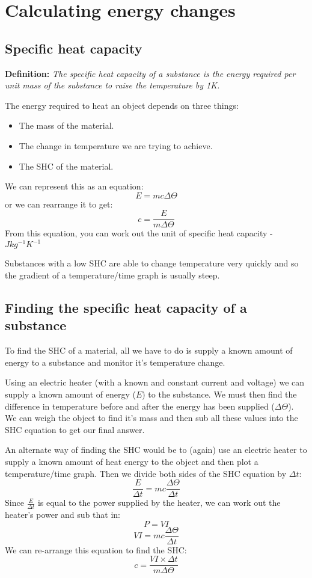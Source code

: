 \documentclass{article}
\begin{document}
\section*{Calculating energy changes}
\subsection*{Specific heat capacity}
\textbf{Definition: }\textit{The specific heat capacity of a substance is the
energy required per unit mass of the substance to raise the temperature by 1K.}

The energy required to heat an object depends on three things:
\begin{itemize}
	\item The mass of the material.
	\item The change in temperature we are trying to achieve.
	\item The SHC of the material.\end{itemize}

We can represent this as an equation:
\[
	E = mc \Delta \Theta
\]
or we can rearrange it to get:
\[
	c = \frac{E}{m \Delta \Theta}
\]
From this equation, you can work out the unit of specific heat capacity -
$J kg^{-1} K^{-1}$

Substances with a low SHC are able to change temperature very quickly and so the
gradient of a temperature/time graph is usually steep.

\subsection*{Finding the specific heat capacity of a substance}
To find the SHC of a material, all we have to do is supply a known amount of
energy to a substance and monitor it's temperature change.

Using an electric heater (with a known and constant current and voltage) we can
supply a known amount of energy ($E$) to the substance. We must then find the
difference in temperature before and after the energy has been supplied
($\Delta \Theta$). We can weigh the object to find it's mass and then sub all
these values into the SHC equation to get our final answer.

An alternate way of finding the SHC would be to (again) use an electric heater
to supply a known amount of heat energy to the object and then plot a
temperature/time graph. Then we divide both sides of the SHC equation by 
$\Delta t$:
\[
	\frac{E}{\Delta t} = mc\frac{\Delta \Theta}{\Delta t}
\]
Since $\frac{E}{\Delta t}$ is equal to the power supplied by the heater, we 
can work out the heater's power and sub that in:
\[
	P = VI
\]
\[
	VI = mc\frac{\Delta \Theta}{\Delta t}
\]
We can re-arrange this equation to find the SHC:
\[
	c = \frac{VI \times \Delta t}{m \Delta \Theta}
\]
\end{document}
